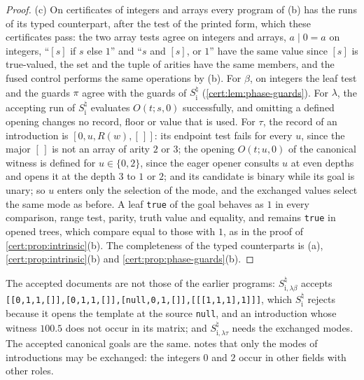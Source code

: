 \begin{proof}
(c) On certificates of integers and arrays every program of (b) has the runs of its typed
counterpart, after the test of the printed form, which these certificates pass: the two array
tests agree on integers and arrays, $a\mathbin{|}0=a$ on integers, ``$[s]$ if $s$ else $1$'' and
``$s$ and $[s]$, or $1$'' have the same value since $[s]$ is true-valued, the set and the tuple
of arities have the same members, and the fused control performs the same operations by (b).
For $\beta$, on integers the leaf test and the guards $\pi$ agree with the guards of
$S^{\natural}_{\mathrm i}$ (\cref{cert:lem:phase-guards}). For $\lambda$, the accepting run of
$S^{\natural}_{\mathrm i}$ evaluates $O(t;s,0)$ successfully, and omitting a defined opening
changes no record, floor or value that is used. For $\tau$, the record of an introduction is
$[0,u,R(w),[\,]]$: its endpoint test fails for every $u$, since the major $[\,]$ is not an array
of arity $2$ or $3$; the opening $O(t;u,0)$ of the canonical witness is defined for $u\in\{0,2\}$,
since the eager opener consults $u$ at even depths and opens it at the depth $3$ to $1$ or $2$;
and its candidate is binary while its goal is unary; so $u$ enters only the selection of the
mode, and the exchanged values select the same mode as before. A leaf \texttt{true} of the goal
behaves as $1$ in every comparison, range test, parity, truth value and equality, and remains
\texttt{true} in opened trees, which compare equal to those with $1$, as in the proof of
\cref{cert:prop:intrinsic}(b). The completeness of the typed counterparts is (a),
\cref{cert:prop:intrinsic}(b) and \cref{cert:prop:phase-guards}(b).
\end{proof}

The accepted documents are not those of the earlier programs: $S^{\natural}_{\mathrm{i},
\lambda\beta}$ accepts \texttt{[[0,1,1,[]],[0,1,1,[]],[null,0,1,[]],[[[1,1,1],1]]]}, which
$S^{\natural}_{\mathrm i}$ rejects because it opens the template at the source
\texttt{null}, and an introduction whose witness $100.5$ does not occur in its matrix; and
$S^{\natural}_{\mathrm{i},\lambda\tau}$ needs the exchanged modes. The accepted canonical goals are
the same.  notes that only the modes of introductions may be exchanged: the
integers $0$ and $2$ occur in other fields with other roles.

